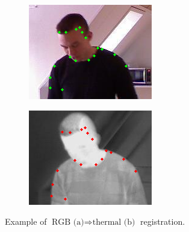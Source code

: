 \documentclass[10pt,twocolumn,letterpaper]{article}
\begin{document}
\begin{figure}[htpb]
\centering
\begin{subfigure}[b]{0.48\columnwidth}
	\includegraphics[width=\columnwidth]{RGBregistered.png}%
	\caption{}%
	\label{}%
\end{subfigure}
\begin{subfigure}[b]{0.48\columnwidth}
	\includegraphics[width=\columnwidth]{Thermalregistered.png}%
	\caption{}%
	\label{}%
\end{subfigure}
\caption{Example of $\text{RGB (a)} \Rightarrow \text{thermal (b)}$ registration.}
\label{fig:registeredImagery}
\end{figure}
\end{document}
